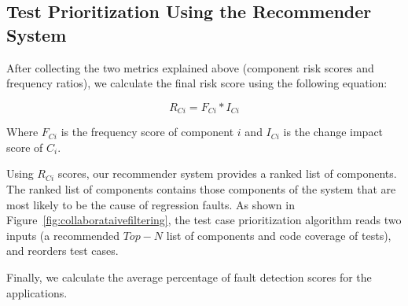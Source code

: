 \vspace*{3pt}
\subsection{Test Prioritization Using the Recommender System}
\label{test-prioritization}

After collecting the two metrics explained above (component risk scores and 
frequency ratios), we calculate the final risk score using the following equation:

\[
{ R_{Ci} = F_{Ci} * I_{Ci}}	
\]

Where $F_{Ci}$ is the frequency score of component $i$ 
and $I_{Ci}$ is the change impact score of $C_i$.  

Using $R_{Ci}$ scores, our recommender system provides a ranked list of components.
The ranked list of components contains those components of the system that are most
likely to be the cause of regression faults. 
As shown in Figure~\ref{fig:collaborataivefiltering}, the test case prioritization algorithm
reads two inputs (a recommended $Top-N$ list of components and code coverage of tests),
and reorders test cases. 

Finally, we calculate the average percentage of fault detection scores 
for the applications. 


